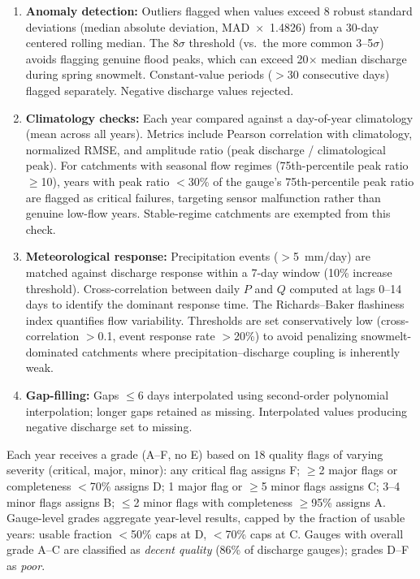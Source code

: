\begin{enumerate}
    \item \textbf{Anomaly detection:} Outliers flagged when values exceed 8 robust standard deviations (median absolute deviation, MAD~$\times$~1.4826) from a 30-day centered rolling median. The 8$\sigma$ threshold (vs.\ the more common 3--5$\sigma$) avoids flagging genuine flood peaks, which can exceed 20$\times$ median discharge during spring snowmelt. Constant-value periods ($>$30 consecutive days) flagged separately. Negative discharge values rejected.
    \item \textbf{Climatology checks:} Each year compared against a day-of-year climatology (mean across all years). Metrics include Pearson correlation with climatology, normalized RMSE, and amplitude ratio (peak discharge / climatological peak). For catchments with seasonal flow regimes (75th-percentile peak ratio $\geq$10), years with peak ratio $<$30\% of the gauge's 75th-percentile peak ratio are flagged as critical failures, targeting sensor malfunction rather than genuine low-flow years. Stable-regime catchments are exempted from this check.
    \item \textbf{Meteorological response:} Precipitation events ($>$5~mm/day) are matched against discharge response within a 7-day window (10\% increase threshold). Cross-correlation between daily $P$ and $Q$ computed at lags 0--14 days to identify the dominant response time. The Richards--Baker flashiness index quantifies flow variability. Thresholds are set conservatively low (cross-correlation $>$0.1, event response rate $>$20\%) to avoid penalizing snowmelt-dominated catchments where precipitation--discharge coupling is inherently weak.
    \item \textbf{Gap-filling:} Gaps $\leq$6 days interpolated using second-order polynomial interpolation; longer gaps retained as missing. Interpolated values producing negative discharge set to missing.
\end{enumerate}

Each year receives a grade (A--F, no E) based on 18 quality flags of varying severity (critical, major, minor): any critical flag assigns F; $\geq$2 major flags or completeness $<$70\% assigns D; 1 major flag or $\geq$5 minor flags assigns C; 3--4 minor flags assigns B; $\leq$2 minor flags with completeness $\geq$95\% assigns A.
Gauge-level grades aggregate year-level results, capped by the fraction of usable years: usable fraction $<$50\% caps at D, $<$70\% caps at C.
Gauges with overall grade A--C are classified as \emph{decent quality} (86\% of discharge gauges); grades D--F as \emph{poor}.

